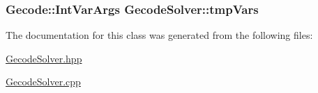 \hypertarget{class_gecode_solver_a33b7c4b99d9be855c3275dad28b6a3e8}{
\subsubsection[{tmp\-Vars}]{\setlength{\rightskip}{0pt plus 5cm}Gecode\-::\-Int\-Var\-Args Gecode\-Solver\-::tmp\-Vars\hspace{0.3cm}{\ttfamily [protected]}}}\label{class_gecode_solver_a33b7c4b99d9be855c3275dad28b6a3e8}


The documentation for this class was generated from the following files\-:\begin{DoxyCompactItemize}
\item 
\hyperlink{_gecode_solver_8hpp}{Gecode\-Solver.\-hpp}\item 
\hyperlink{_gecode_solver_8cpp}{Gecode\-Solver.\-cpp}\end{DoxyCompactItemize}
